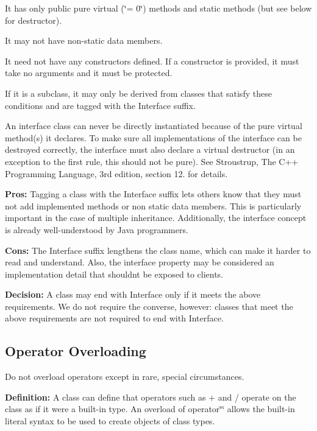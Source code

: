 \begin{DoxyItemize}
\item It has only public pure virtual (\char`\"{}= 0\char`\"{}) methods and static methods (but see below for destructor).
\item It may not have non-\/static data members.
\item It need not have any constructors defined. If a constructor is provided, it must take no arguments and it must be protected.
\item If it is a subclass, it may only be derived from classes that satisfy these conditions and are tagged with the Interface suffix.
\end{DoxyItemize}

An interface class can never be directly instantiated because of the pure virtual method(s) it declares. To make sure all implementations of the interface can be destroyed correctly, the interface must also declare a virtual destructor (in an exception to the first rule, this should not be pure). See Stroustrup, The C++ Programming Language, 3rd edition, section 12. for details.

{\bfseries Pros\+:} Tagging a class with the {\ttfamily Interface} suffix lets others know that they must not add implemented methods or non static data members. This is particularly important in the case of multiple inheritance. Additionally, the interface concept is already well-\/understood by Java programmers.

{\bfseries Cons\+:} The {\ttfamily Interface} suffix lengthens the class name, which can make it harder to read and understand. Also, the interface property may be considered an implementation detail that shouldn\textquotesingle{}t be exposed to clients.

{\bfseries Decision\+:} A class may end with {\ttfamily Interface} only if it meets the above requirements. We do not require the converse, however\+: classes that meet the above requirements are not required to end with {\ttfamily Interface}.

\subsection*{Operator Overloading}

Do not overload operators except in rare, special circumstances.

{\bfseries Definition\+:} A class can define that operators such as + and / operate on the class as if it were a built-\/in type. An overload of {\ttfamily operator\char`\"{}\char`\"{}} allows the built-\/in literal syntax to be used to create objects of class types.

